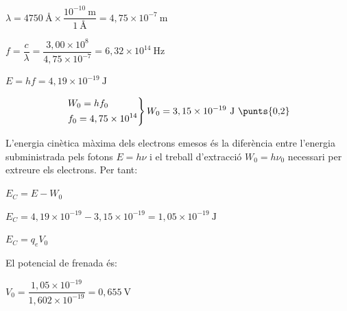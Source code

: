 \begin{solapartat}
 $\lambda = 4750\ \text{Å}\times\dfrac{10^{-10}\ \mathrm{m}}{1\ \text{Å}} = 4,75\times 10^{-7}\ \mathrm{m}$

 $f = \dfrac{c}{\lambda} = \dfrac{3,00\times 10^{8}}{4,75\times 10^{-7}} = 6,32\times 10^{14}\ \mathrm{Hz}$

 $E = hf = 4,19\times 10^{-19}\ \mathrm{J}$

\[ \left.\begin{aligned} &W_0 = hf_0\\ &f_0 = 4,75\times 10^{14}\end{aligned}\right\} W_0 = 3,15\times 10^{-19}\ \mathrm{J}\ \text{\punts{0,2}} \]
\end{solapartat}

\begin{solapartat}
L'energia cinètica màxima dels electrons emesos és la diferència entre l'energia subministrada pels fotons $E = h\nu$ i el treball d'extracció $W_0 = h\nu_0$ necessari per extreure els electrons. Per tant:

 $E_C = E - W_0$

 $E_C = 4,19\times 10^{-19} - 3,15\times 10^{-19} = 1,05\times 10^{-19}\ \mathrm{J}$

 $E_C = q_e V_0$

El potencial de frenada és:

 $V_0 = \dfrac{1,05\times 10^{-19}}{1,602\times 10^{-19}} = 0,655\ \mathrm{V}$
\end{solapartat}
